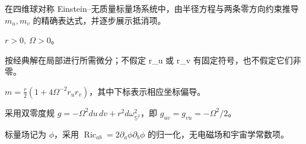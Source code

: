 


在四维球对称 Einstein–无质量标量场系统中，由半径方程与两条零方向约束推导 \(m_u,m_v\) 的精确表达式，并逐步展示抵消项。



\(r>0,\ \Omega>0\)。


按经典解在局部进行所需微分；不假定 r_u 或 r_v 有固定符号，也不假定它们非零。



\(m=\frac r2(1+4\Omega^{-2}r_u r_v)\)，其中下标表示相应坐标偏导。


采用双零度规 \(g=-\Omega^2du\,dv+r^2d\omega_{\mathbb S^2}^2\)，即 \(g_{uv}=g_{vu}=-\Omega^2/2\)。


标量场记为 \(\phi\)，采用 \(\operatorname{Ric}_{ab}=2\partial_a\phi\partial_b\phi\) 的归一化，无电磁场和宇宙学常数项。
